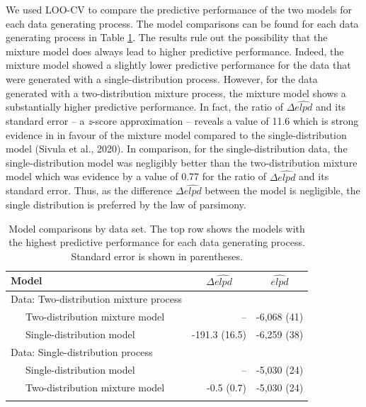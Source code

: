 \begin{appendix}
\begin{table}[tbp]
\begin{center}
\begin{threeparttable}
\end{threeparttable}
\end{center}

\end{table}

We used LOO-CV to compare the predictive performance of the two models
for each data generating process. The model comparisons can be found for
each data generating process in Table \ref{tab:loossim}. The results
rule out the possibility that the mixture model does always lead to
higher predictive performance. Indeed, the mixture model showed a
slightly lower predictive performance for the data that were generated
with a single-distribution process. However, for the data generated with
a two-distribution mixture process, the mixture model shows a
substantially higher predictive performance. In fact, the ratio of
\(\Delta\widehat{elpd}\) and its standard error -- a \emph{z}-score
approximation -- reveals a value of 11.6 which is strong evidence in in
favour of the mixture model compared to the single-distribution model
(Sivula et al., 2020). In comparison, for the single-distribution data,
the single-distribution model was negligibly better than the
two-distribution mixture model which was evidence by a value of 0.77 for
the ratio of \(\Delta\widehat{elpd}\) and its standard error. Thus, as
the difference \(\Delta\widehat{elpd}\) between the model is negligible,
the single distribution is preferred by the law of parsimony.

\begin{table}[tbp]

\begin{center}
\begin{threeparttable}

\caption{\label{tab:loossim}Model comparisons by data set. The top row shows the models with the highest predictive performance for each data generating process. Standard error is shown in parentheses.}

\begin{tabular}{lrr}
\toprule
Model & \multicolumn{1}{c}{$\Delta\widehat{elpd}$} & \multicolumn{1}{c}{$\widehat{elpd}$}\\
\midrule
Data: Two-distribution mixture process &  & \\
\ \ \ Two-distribution mixture model & -- & -6,068 (41)\\
\ \ \ Single-distribution model & -191.3 (16.5) & -6,259 (38)\\
Data: Single-distribution process &  & \\
\ \ \ Single-distribution model & -- & -5,030 (24)\\
\ \ \ Two-distribution mixture model & -0.5 (0.7) & -5,030 (24)\\
\bottomrule
\addlinespace
\end{tabular}


\end{threeparttable}
\end{center}
\end{table}
\end{appendix}

